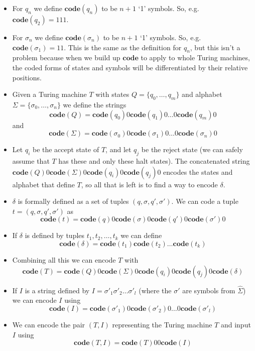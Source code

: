 \documentclass{article}
\theoremstyle{plain}
\theoremstyle{definition}
\newcommand{\co}{\mathbf{code}}
\begin{document}
\begin{itemize}
\item For $q_n$ we define $\co(q_n)$ to be $n+1$ `1' symbols. So, e.g. $\co(q_2)=111$.
\item For $\sigma_n$ we define $\co(\sigma_n)$ to be $n+1$ `1' symbols. So, e.g. $\co(\sigma_1)=11$. This is the same as the definition for $q_n$, but this isn't a problem because when we build up $\co$ to apply to whole Turing machines, the coded forms of states and symbols will be differentiated by their relative positions.
\item Given a Turing machine $T$ with states $Q=\{q_0,\ldots,q_m\}$ and alphabet $\Sigma=\{\sigma_0,\ldots,\sigma_n\}$ we define the strings 
\begin{equation*}\co(Q)=\co(q_0)0\co(q_1)0\ldots0\co(q_m)0\end{equation*}
and
\begin{equation*}\co(\Sigma)=\co(\sigma_0)0\co(\sigma_1)0\ldots0\co(\sigma_n)0\end{equation*}
\item Let $q_i$ be the accept state of $T$, and let $q_j$ be the reject state (we can safely assume that $T$ has these and only these halt states). The concatenated string $\co(Q)0\co(\Sigma)0\co(q_i)0\co(q_j)0$ encodes the states and alphabet that define $T$, so all that is left is to find a way to encode $\delta$.
\item $\delta$ is formally defined as a set of tuples $(q,\sigma,q',\sigma')$. We can code a tuple $t=(q,\sigma,q',\sigma')$ as 
\begin{equation*}\co(t)=\co(q)0\co(\sigma)0\co(q')0\co(\sigma')0\end{equation*} 
\item If $\delta$ is defined by tuples $t_1,t_2,\ldots,t_k$ we can define 
\begin{equation*}\co(\delta)=\co(t_1)\co(t_2)\ldots \co(t_k)\end{equation*}
\item Combining all this we can encode $T$ with 
\begin{equation*}\co(T)= \co(Q)0\co(\Sigma)0\co(q_i)0\co(q_j)0\co(\delta)\end{equation*}
\item If $I$ is a string defined by $I=\sigma'_1\sigma'_2\ldots\sigma'_l$ (where the $\sigma'$ are symbols from $\hat{\Sigma}$) we can encode $I$ using 
\begin{equation*}\co(I)=\co(\sigma'_1)0\co(\sigma'_2)0\ldots 0\co(\sigma'_l)\end{equation*}
\item We can encode the pair $(T,I)$ representing the Turing machine $T$ and input $I$ using 
\begin{equation*}\co(T,I)=\co(T)00\co(I)\end{equation*}
\end{itemize}   
\end{document}
